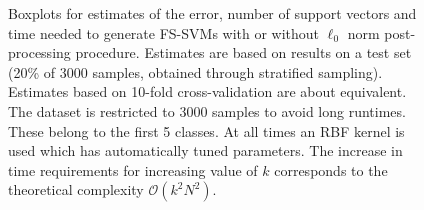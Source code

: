 \begin{figure}[!htb]
\begin{minipage}{\textwidth}
	\hfil
	\hfil
	\caption*{$k=8$}
\end{minipage}
\caption{Boxplots for estimates of the error, number of support vectors and time needed to generate FS-SVMs with or without $\ell_0$ norm post-processing procedure. Estimates are based on results on a test set (20\% of 3000 samples, obtained through stratified sampling). Estimates based on 10-fold cross-validation are about equivalent. The dataset is restricted to 3000 samples to avoid long runtimes. These belong to the first 5 classes. At all times an RBF kernel is used which has automatically tuned parameters. The increase in time requirements for increasing value of $k$ corresponds to the theoretical complexity $\mathcal{O}(k^2N^2)$.}
\label{shuttleestimates}
\end{figure}